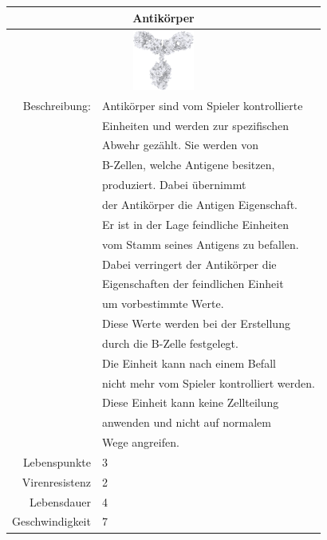 \documentclass[11pt]{article}
\begin{document}
\begin{tabular}{|r|l|}
\hline
\multicolumn{2}{c}{Antik\"orper}\\\hline\hline
\multicolumn{2}{c}{\includegraphics[width=2cm]{antikoerperorig.png}}\\\hline\hline
Beschreibung:	& Antik\"orper sind vom Spieler kontrollierte\\
			& Einheiten und werden zur spezifischen\\
			& Abwehr gez\"ahlt. Sie werden von\\
			& B-Zellen, welche Antigene besitzen,\\
			& produziert. Dabei \"ubernimmt\\
			& der Antik\"orper die Antigen Eigenschaft.\\
			& Er ist in der Lage feindliche Einheiten\\
			& vom Stamm seines Antigens zu befallen.\\
			& Dabei verringert der Antik\"orper die\\
			& Eigenschaften der feindlichen Einheit\\
			& um vorbestimmte Werte.\\
			& Diese Werte werden bei der Erstellung\\
			& durch die B-Zelle festgelegt.\\
			& Die Einheit kann nach einem Befall\\
			& nicht mehr vom Spieler kontrolliert werden.\\
			& Diese Einheit kann keine Zellteilung\\
			& anwenden und nicht auf normalem\\
			& Wege angreifen.\\\hline
Lebenspunkte	& 3\\\hline
Virenresistenz	& 2\\\hline
Lebensdauer		& 4\\\hline
Geschwindigkeit	& 7\\\hline
\end{tabular}
\end{document}
